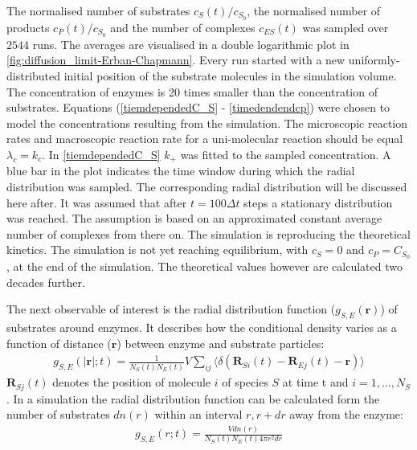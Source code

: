 \documentclass[
  a4paper,BCOR10mm,oneside,
  headsepline,footsepline,%
  fleqn,openbib
]{scrbook}
\begin{document}
The normalised number of substrates $c_{S}(t)/c_{S_0}$, the normalised number of products $c_{P}(t)/c_{S_0}$ and the number of complexes $c_{ES}(t)$ was sampled over $2544$ runs. The averages are visualised in a double logarithmic plot in \cref{fig:diffusion_limit-Erban-Chapmann}. Every run started with a new uniformly-distributed initial position of the substrate molecules in the simulation volume. The concentration of enzymes is 20 times smaller than the concentration of substrates. Equations (\ref{tiemdependedC_S} - \ref{timedendendcp})  were chosen to model the concentrations resulting from the simulation. The microscopic reaction rates and macroscopic reaction rate for a uni-molecular reaction should be equal $\lambda_c=k_c$. In \cref{tiemdependedC_S} $k_+$ was fitted to the sampled concentration. A blue bar in the plot indicates the time window during which the radial distribution was sampled. The corresponding radial distribution will be discussed here after. It was assumed that after $t=100 \Delta t$ steps a stationary distribution was reached. The assumption is based on an approximated constant average number of complexes from there on. The simulation is reproducing the theoretical kinetics. The simulation is not yet reaching equilibrium, with $c_S=0$ and $c_P=C_{S_0}$, at the end of the simulation. The theoretical values however are calculated two decades further. \par
The next observable of interest is the radial distribution function ($g_{S,E}(\bm{r})$) of substrates around enzymes. It describes how the conditional density varies as a function of distance ($\bm{r}$) between enzyme and substrate particles:  
\begin{align}
 g_{S,E}(|\bm{r}|;t)=\frac{1}{ N_S (t) N_E(t)} V \sum_{ij} \langle \delta(\bm{R}_{S i}(t)-\bm{R}_{E j}(t)-\bm{r})\rangle
\end{align}
 $\bm{R}_{S j}(t)$ denotes the position of molecule $i$ of species $S$ at time t and $i=1,...,N_{S}$.
In a simulation the radial distribution function can be calculated form the number of substrates $dn(r)$ within an interval $r,r+dr$ away from the enzyme:
\begin{align}
 g_{S,E}(r;t)=\frac{V dn(r)}{  N_S (t) N_E(t) 4\pi r^2 dr} \label{eq:messsungradial}
\end{align}
\end{document}
